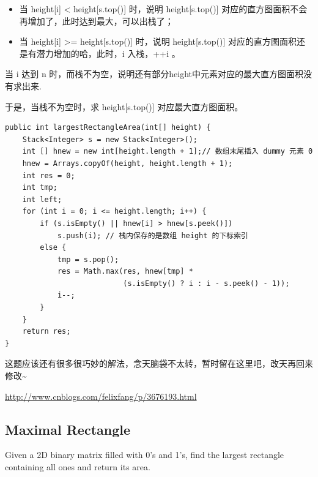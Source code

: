\documentclass[12pt]{book}
\begin{document}
\begin{enumerate}
\begin{itemize}
\item 当 height[i] < height[s.top()] 时，说明 height[s.top()] 对应的直方图面积不会再增加了，此时达到最大，可以出栈了；

\item 当 height[i] >= height[s.top()] 时，说明 height[s.top()] 对应的直方图面积还是有潜力增加的哈，此时，i 入栈，++i 。
\end{itemize}

当 i 达到 n 时，而栈不为空，说明还有部分height中元素对应的最大直方图面积没有求出来.

于是，当栈不为空时，求 height[s.top()] 对应最大直方图面积。

\lstset{language=java,label= ,caption= ,numbers=none}
\begin{lstlisting}
public int largestRectangleArea(int[] height) {
    Stack<Integer> s = new Stack<Integer>();
    int [] hnew = new int[height.length + 1];// 数组末尾插入 dummy 元素 0
    hnew = Arrays.copyOf(height, height.length + 1);
    int res = 0; 
    int tmp;     
    int left;
    for (int i = 0; i <= height.length; i++) {
        if (s.isEmpty() || hnew[i] > hnew[s.peek()])
            s.push(i); // 栈内保存的是数组 height 的下标索引
        else {
            tmp = s.pop();
            res = Math.max(res, hnew[tmp] * 
                           (s.isEmpty() ? i : i - s.peek() - 1));
            i--;
        }
    }
    return res;
}
\end{lstlisting}

这题应该还有很多很巧妙的解法，念天脑袋不太转，暂时留在这里吧，改天再回来修改\textasciitilde{}~

\url{http://www.cnblogs.com/felixfang/p/3676193.html}
\end{enumerate}

\subsection{Maximal Rectangle}
\label{sec-5-3-4}
Given a 2D binary matrix filled with 0's and 1's, find the largest rectangle containing all ones and return its area.
\end{document}
